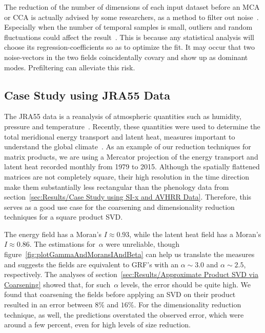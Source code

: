 \documentclass[ijgi,article,submit,moreauthors,pdftex,10pt,a4paper]{Definitions/mdpi}
\begin{document}
The reduction of the number of dimensions of each input dataset before an MCA or CCA is actually advised by some researchers, as a method to filter out noise~\cite{Barnett1987}. Especially when the number of temporal samples is small, outliers and random fluctuations could affect the result~\cite{Bretherton1992}. This is because any statistical analysis will choose its regression-coefficients so as to optimize the fit. It may occur that two noise-vectors in the two fields coincidentally covary and show up as dominant modes. Prefiltering can alleviate this risk.

\subsection{Case Study using JRA55 Data}
\label{sec:Results/Case Study using JRA55 Data}

The JRA55 data is a reanalysis of atmospheric quantities such as humidity, pressure and temperature~\cite{Kobayashi2015}. Recently, these quantities were used to determine the total meridional energy transport and latent heat, measures important to understand the global climate~\cite{Liu2018}. As an example of our reduction techniques for matrix products, we are using a Mercator projection of the energy transport and latent heat recorded monthly from 1979 to 2015. Although the spatially flattened matrices are not completely square, their high resolution in the time direction make them substantially less rectangular than the phenology data from section~\ref{sec:Results/Case Study using SI-x and AVHRR Data}. Therefore, this serves as a good use case for the coarsening and dimensionality reduction techniques for a square product SVD.

The energy field has a Moran's $I \approx 0.93$, while the latent heat field has a Moran's $I \approx 0.86$. The estimations for~$\alpha$ were unreliable, though figure~\ref{fig:plotGammaAndMoransIAndBeta} can help us translate the measures and suggests the fields are equivalent to GRF's with an $\alpha \sim 3.0$ and $\alpha \sim 2.5$, respectively. The analyses of section~\ref{sec:Results/Approximate Product SVD via Coarsening} showed that, for such~$\alpha$ levels, the error should be quite high. We found that coarsening the fields before applying an SVD on their product resulted in an error between $8\%$ and $16\%$. For the dimensionality reduction technique, as well, the predictions overstated the observed error, which were around a few percent, even for high levels of size reduction. 
\end{document}
